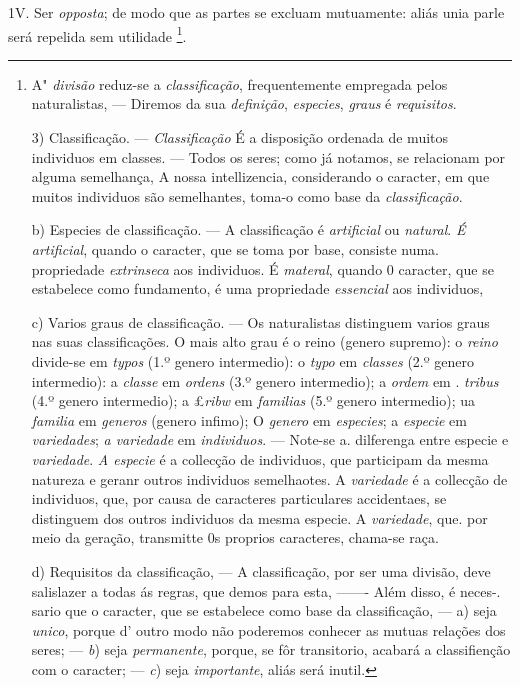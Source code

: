 1V. Ser \emph{opposta}; de modo que as partes se excluam mutuamente: aliás unia parle será repelida sem utilidade \footnote{A" \emph{divisão} reduz-se a \emph{classificação}, frequentemente empregada pelos naturalistas, --- Diremos da sua \emph{definição}, \emph{especies}, \emph{graus} é \emph{requisitos}.\par 3) Classificação. --- \emph{Classificação} É a disposição ordenada de muitos individuos em classes. --- Todos os seres; como já notamos, se relacionam por alguma semelhança, A nossa intellizencia, considerando o caracter, em que muitos individuos são semelhantes, toma-o como base da \emph{classificação}.\par b) Especies de classificação. --- A classificação é \emph{artificial} ou \emph{natural}. \emph{É artificial}, quando o caracter, que se toma por base, consiste numa. propriedade \emph{extrinseca} aos individuos. É \emph{materal}, quando 0 caracter, que se estabelece como fundamento, é uma propriedade \emph{essencial} aos individuos,\par c) Varios graus de classificação. --- Os naturalistas distinguem varios graus nas suas classificações. O mais alto grau é o reino (genero supremo): o \emph{reino} divide-se em \emph{typos} (1.º genero intermedio): o \emph{typo} em \emph{classes} (2.º genero intermedio): a \emph{classe} em \emph{ordens} (3.º genero intermedio); a \emph{ordem} em . \emph{tribus} (4.º genero intermedio); a £\emph{ribw} em \emph{familias} (5.º genero intermedio); ua \emph{familia} em \emph{generos} (genero infimo); O \emph{genero} em \emph{especies}; a \emph{especie} em \emph{variedades}; \emph{a variedade} em \emph{individuos}. --- Note-se a. dilferenga entre especie e \emph{variedade}. \emph{A especie} é a collecção de individuos, que participam da mesma natureza e geranr outros individuos semelhaotes. A \emph{variedade} é a collecção de individuos, que, por causa de caracteres particulares accidentaes, se distinguem dos outros individuos da mesma especie. A \emph{variedade}, que. por meio da geração, transmitte 0s proprios caracteres, chama-se raça.\par d) Requisitos da classificação, --- A classificação, por ser uma divisão, deve salislazer a todas ás regras, que demos para esta, ------- Além disso, é neces-. sario que o caracter, que se estabelece como base da classificação, --- a) seja \emph{unico}, porque d' outro modo não poderemos conhecer as mutuas relações dos seres; --- \emph{b}) seja \emph{permanente}, porque, se fôr transitorio, acabará a classifienção com o caracter; --- \emph{c}) seja \emph{importante}, aliás será inutil.}.

